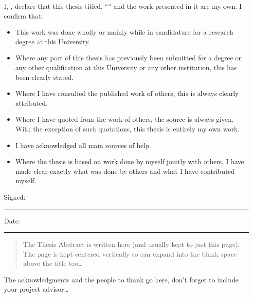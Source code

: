 \documentclass[
    11pt,
    oneside, %
    english,
    singlespacing, %
    headsepline, %
]{MastersDoctoralThesis}
\begin{document}
    \begin{declaration}
        \addchaptertocentry{\authorshipname} %
        \noindent I, \authorname, declare that this thesis titled, \enquote{\ttitle} and the work presented in it are my own. I confirm that:

        \begin{itemize}
            \item This work was done wholly or mainly while in candidature for a research degree at this University.
            \item Where any part of this thesis has previously been submitted for a degree or any other qualification at this University or any other institution, this has been clearly stated.
            \item Where I have consulted the published work of others, this is always clearly attributed.
            \item Where I have quoted from the work of others, the source is always given. With the exception of such quotations, this thesis is entirely my own work.
            \item I have acknowledged all main sources of help.
            \item Where the thesis is based on work done by myself jointly with others, I have made clear exactly what was done by others and what I have contributed myself.\\
        \end{itemize}

        \noindent Signed:\\
        \rule[0.5em]{25em}{0.5pt} %

        \noindent Date:\\
        \rule[0.5em]{25em}{0.5pt} %
    \end{declaration}


    \begin{abstract}
        \addchaptertocentry{\abstractname} %
        The Thesis Abstract is written here (and usually kept to just this page).
        The page is kept centered vertically so can expand into the blank space above the title too\ldots
    \end{abstract}


    \begin{acknowledgements}
        \addchaptertocentry{\acknowledgementname} %
        The acknowledgments and the people to thank go here, don't forget to include your project advisor\ldots
    \end{acknowledgements}
\end{document}
